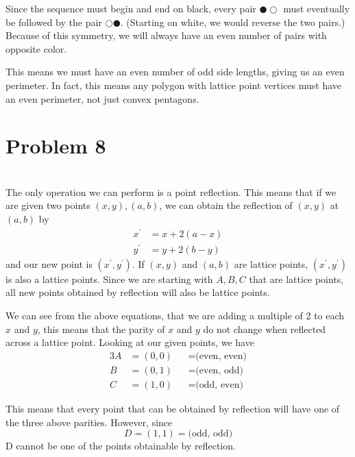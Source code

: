 \documentclass[12pt]{article}
\begin{document}
Since the sequence must begin and end on black, every pair $\CIRCLE \Circle$ must eventually be followed by the pair $\Circle \CIRCLE$. (Starting on white, we would reverse the two pairs.) Because of this symmetry, we will always have an even number of pairs with opposite color.

This means we must have an even number of odd side lengths, giving us an even perimeter. In fact, this means any polygon with lattice point vertices must have an even perimeter, not just convex pentagons.


\section*{Problem 8}
\\

The only operation we can perform is a point reflection. This means that if we are given two points $(x, y), (a, b)$, we can obtain the reflection of $(x,y)$ at $(a,b)$ by
\begin{align*}
    x^\prime &= x+2(a-x) \\
    y^\prime &=  y+2(b-y)
\end{align*}
and our new point is $(x^\prime, y^\prime)$. If $(x,y)$ and $(a,b)$ are lattice points, $(x^\prime, y^\prime)$ is also a lattice points. Since we are starting with $A, B, C$ that are lattice points, all new points obtained by reflection will also be lattice points.

We can see from the above equations, that we are  adding a multiple of 2 to each $x$ and $y$, this means that the parity of $x$ and $y$ do not change when reflected across a lattice point. Looking at our given points, we have
\begin{alignat*}{3}
    A &= (0,0) &&= \text{(even, even)} \\
    B &= (0,1) &&= \text{(even, odd)} \\
    C &= (1,0) &&= \text{(odd, even)} 
\end{alignat*}

This means that every point that can be obtained by reflection will have one of the three above parities. However, since
\[D = (1,1) = \text{(odd, odd)}\]
D cannot be one of the points obtainable by reflection.


 
\end{document}
